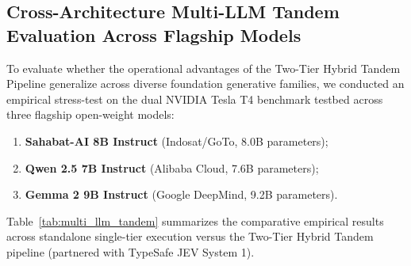 \documentclass[journal,compsoc]{IEEEtran}
\begin{document}
\subsection{Cross-Architecture Multi-LLM Tandem Evaluation Across Flagship Models}
To evaluate whether the operational advantages of the Two-Tier Hybrid Tandem Pipeline generalize across diverse foundation generative families, we conducted an empirical stress-test on the dual NVIDIA Tesla T4 benchmark testbed across three flagship open-weight models:
\begin{enumerate}
    \item \textbf{Sahabat-AI 8B Instruct} (Indosat/GoTo, 8.0B parameters);
    \item \textbf{Qwen 2.5 7B Instruct} (Alibaba Cloud, 7.6B parameters);
    \item \textbf{Gemma 2 9B Instruct} (Google DeepMind, 9.2B parameters).
\end{enumerate}
Table~\ref{tab:multi_llm_tandem} summarizes the comparative empirical results across standalone single-tier execution versus the Two-Tier Hybrid Tandem pipeline (partnered with TypeSafe JEV System 1).
\end{document}
